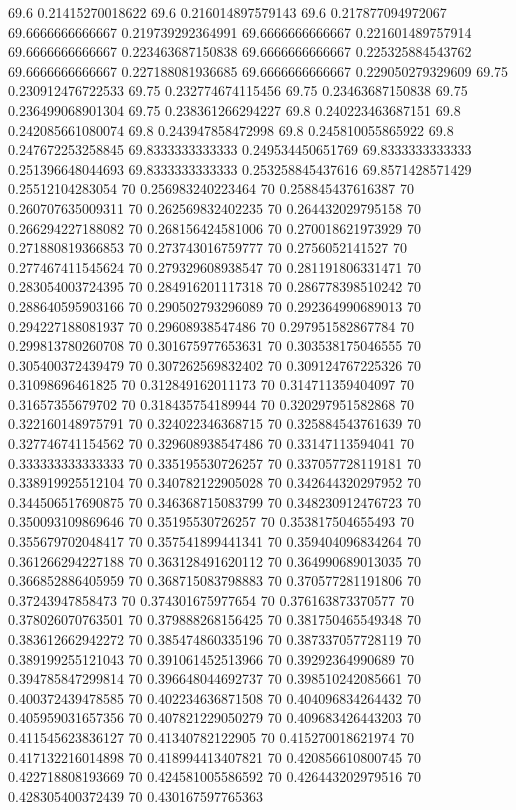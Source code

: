 {69.6 0.21415270018622
69.6 0.216014897579143
69.6 0.217877094972067
69.6666666666667 0.219739292364991
69.6666666666667 0.221601489757914
69.6666666666667 0.223463687150838
69.6666666666667 0.225325884543762
69.6666666666667 0.227188081936685
69.6666666666667 0.229050279329609
69.75 0.230912476722533
69.75 0.232774674115456
69.75 0.23463687150838
69.75 0.236499068901304
69.75 0.238361266294227
69.8 0.240223463687151
69.8 0.242085661080074
69.8 0.243947858472998
69.8 0.245810055865922
69.8 0.247672253258845
69.8333333333333 0.249534450651769
69.8333333333333 0.251396648044693
69.8333333333333 0.253258845437616
69.8571428571429 0.25512104283054
70 0.256983240223464
70 0.258845437616387
70 0.260707635009311
70 0.262569832402235
70 0.264432029795158
70 0.266294227188082
70 0.268156424581006
70 0.270018621973929
70 0.271880819366853
70 0.273743016759777
70 0.2756052141527
70 0.277467411545624
70 0.279329608938547
70 0.281191806331471
70 0.283054003724395
70 0.284916201117318
70 0.286778398510242
70 0.288640595903166
70 0.290502793296089
70 0.292364990689013
70 0.294227188081937
70 0.29608938547486
70 0.297951582867784
70 0.299813780260708
70 0.301675977653631
70 0.303538175046555
70 0.305400372439479
70 0.307262569832402
70 0.309124767225326
70 0.31098696461825
70 0.312849162011173
70 0.314711359404097
70 0.31657355679702
70 0.318435754189944
70 0.320297951582868
70 0.322160148975791
70 0.324022346368715
70 0.325884543761639
70 0.327746741154562
70 0.329608938547486
70 0.33147113594041
70 0.333333333333333
70 0.335195530726257
70 0.337057728119181
70 0.338919925512104
70 0.340782122905028
70 0.342644320297952
70 0.344506517690875
70 0.346368715083799
70 0.348230912476723
70 0.350093109869646
70 0.35195530726257
70 0.353817504655493
70 0.355679702048417
70 0.357541899441341
70 0.359404096834264
70 0.361266294227188
70 0.363128491620112
70 0.364990689013035
70 0.366852886405959
70 0.368715083798883
70 0.370577281191806
70 0.37243947858473
70 0.374301675977654
70 0.376163873370577
70 0.378026070763501
70 0.379888268156425
70 0.381750465549348
70 0.383612662942272
70 0.385474860335196
70 0.387337057728119
70 0.389199255121043
70 0.391061452513966
70 0.39292364990689
70 0.394785847299814
70 0.396648044692737
70 0.398510242085661
70 0.400372439478585
70 0.402234636871508
70 0.404096834264432
70 0.405959031657356
70 0.407821229050279
70 0.409683426443203
70 0.411545623836127
70 0.41340782122905
70 0.415270018621974
70 0.417132216014898
70 0.418994413407821
70 0.420856610800745
70 0.422718808193669
70 0.424581005586592
70 0.426443202979516
70 0.428305400372439
70 0.430167597765363
}
